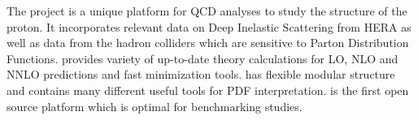 
\label{sec:summary}
The \fitter project is a unique platform for QCD analyses to study the 
structure of the proton.
It incorporates relevant data on
Deep Inelastic Scattering from HERA as well as data from the hadron colliders 
which are sensitive to Parton Distribution Functions. 
\fitter provides variety of up-to-date theory calculations for
LO, NLO and NNLO predictions and fast minimization tools.
\fitter has flexible modular structure and contains many different useful tools for PDF interpretation. 
\fitter is the first open source platform which is optimal for benchmarking studies.

